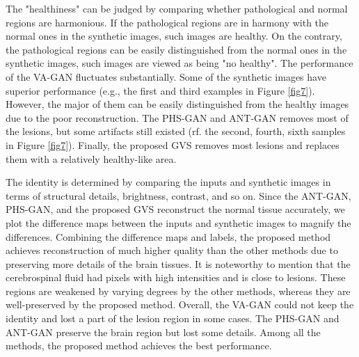 \documentclass[journal,twoside,web]{ieeecolor}
\begin{document}
The "healthiness" can be judged by comparing whether pathological and normal regions are harmonious. If the pathological regions are in harmony with the normal ones in the synthetic images, such images are healthy. On the contrary, the pathological regions can be easily distinguished from the normal ones in the synthetic images, such images are viewed as being "no healthy". The performance of the VA-GAN fluctuates substantially. Some of the synthetic images have superior performance (e.g., the first and third examples in Figure \ref{fig7}). However, the major of them can be easily distinguished from the healthy images due to the poor reconstruction. The PHS-GAN and ANT-GAN removes most of the lesions, but some artifacts still existed (rf. the second, fourth, sixth samples in Figure \ref{fig7}). Finally, the proposed GVS removes most lesions and replaces them with a relatively healthy-like area.

The identity is determined by comparing the inputs and synthetic images in terms of structural details, brightness, contrast, and so on. Since the ANT-GAN, PHS-GAN, and the proposed GVS reconstruct the normal tissue accurately, we plot the difference maps between the inputs and synthetic images to magnify the differences. Combining the difference maps and labels, the proposed method achieves reconstruction of much higher quality than the other methods due to preserving more details of the brain tissues. It is noteworthy to mention that the cerebrospinal fluid had pixels with high intensities and is close to lesions. These regions are weakened by varying degrees by the other methods, whereas they are well-preserved by the proposed method. Overall, the VA-GAN could not keep the identity and lost a part of the lesion region in some cases. The PHS-GAN and ANT-GAN preserve the brain region but lost some details. Among all the methods, the proposed method achieves the best performance.
\end{document}
